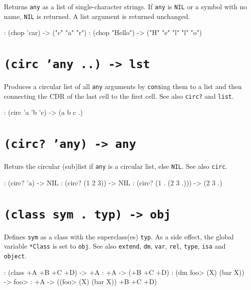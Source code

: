 Returns \texttt{any} as a list of single-character strings. If \texttt{any} is \texttt{NIL}
or a symbol with no name, \texttt{NIL} is returned. A list argument is returned
unchanged.


\begin{wideverbatim}
: (chop 'car)
-> ("c" "a" "r")
: (chop "Hello")
-> ("H" "e" "l" "l" "o")
\end{wideverbatim}

 
\section*{\texttt{(circ 'any ..) -> lst}}
\label{sec:funct-rec-C-(circ-'any-..)-->-lst}


Produces a circular list of all \texttt{any} arguments by \texttt{cons}ing them to a
list and then connecting the CDR of the last cell to the first cell. See
also \texttt{circ?} and \texttt{list}.


\begin{wideverbatim}
: (circ 'a 'b 'c)
-> (a b c .)
\end{wideverbatim}

 
\section*{\texttt{(circ? 'any) -> any}}
\label{sec:funct-rec-C-(circ?-'any)-->-any}


Returs the circular (sub)list if \texttt{any} is a circular list, else \texttt{NIL}.
See also \texttt{circ}.


\begin{wideverbatim}
: (circ? 'a)
-> NIL
: (circ? (1 2 3))
-> NIL
: (circ? (1 . (2 3 .)))
-> (2 3 .)
\end{wideverbatim}

 
\section*{\texttt{(class sym . typ) -> obj}}
\label{sec:funct-rec-C-(class-sym-.-typ)-->-obj}


Defines \texttt{sym} as a class with the superclass(es) \texttt{typ}. As a side
effect, the global variable \texttt{*Class} is set to \texttt{obj}. See also \texttt{extend},
\texttt{dm}, \texttt{var}, \texttt{rel}, \texttt{type}, \texttt{isa} and \texttt{object}.


\begin{wideverbatim}
: (class +A +B +C +D)
-> +A
: +A
-> (+B +C +D)
: (dm foo> (X) (bar X))
-> foo>
: +A
-> ((foo> (X) (bar X)) +B +C +D)
\end{wideverbatim}

